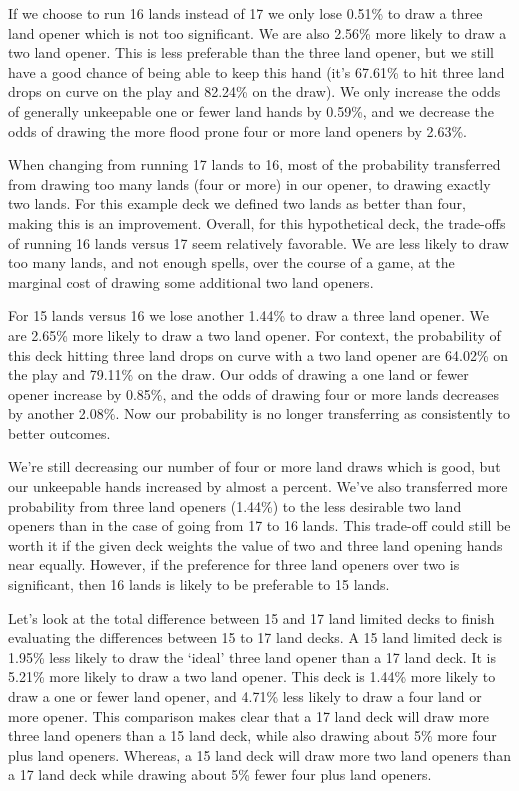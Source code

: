 \documentclass[oneside]{book}   %
\begin{document}
If we choose to run 16 lands instead of 17 we only lose 0.51\% to draw a three land opener which is not too significant. We are also 2.56\% more likely to draw a two land opener. This is less preferable than the three land opener, but we still have a good chance of being able to keep this hand (it's 67.61\% to hit three land drops on curve on the play and 82.24\% on the draw). We only increase the odds of generally unkeepable one or fewer land hands by 0.59\%, and we decrease the odds of drawing the more flood prone four or more land openers by 2.63\%. 

When changing from running 17 lands to 16, most of the probability transferred from drawing too many lands (four or more) in our opener, to drawing exactly two lands. For this example deck we defined two lands as better than four, making this is an improvement. Overall, for this hypothetical deck, the trade-offs of running 16 lands versus 17 seem relatively favorable. We are less likely to draw too many lands, and not enough spells, over the course of a game, at the marginal cost of drawing some additional two land openers.

For 15 lands versus 16 we lose another 1.44\% to draw a three land opener. We are 2.65\% more likely to draw a two land opener. For context, the probability of this deck hitting three land drops on curve with a two land opener are 64.02\% on the play and 79.11\% on the draw. Our odds of drawing a one land or fewer opener increase by 0.85\%, and the odds of drawing four or more lands decreases by another 2.08\%. Now our probability is no longer transferring as consistently to better outcomes. 

We're still decreasing our number of four or more land draws which is good, but our unkeepable hands increased by almost a percent. We've also transferred more probability from three land openers (1.44\%) to the less desirable two land openers than in the case of going from 17 to 16 lands. This trade-off could still be worth it if the given deck weights the value of two and three land opening hands near equally. However, if the preference for three land openers over two is significant, then 16 lands is likely to be preferable to 15 lands.

Let's look at the total difference between 15 and 17 land limited decks to finish evaluating the differences between 15 to 17 land decks. A 15 land limited deck is 1.95\% less likely to draw the `ideal' three land opener than a 17 land deck. It is 5.21\% more likely to draw a two land opener. This deck is 1.44\% more likely to draw a one or fewer land opener, and 4.71\% less likely to draw a four land or more opener. This comparison makes clear that a 17 land deck will draw more three land openers than a 15 land deck, while also drawing about 5\% more four plus land openers. Whereas, a 15 land deck will draw more two land openers than a 17 land deck while drawing about 5\% fewer four plus land openers. 
\end{document}
